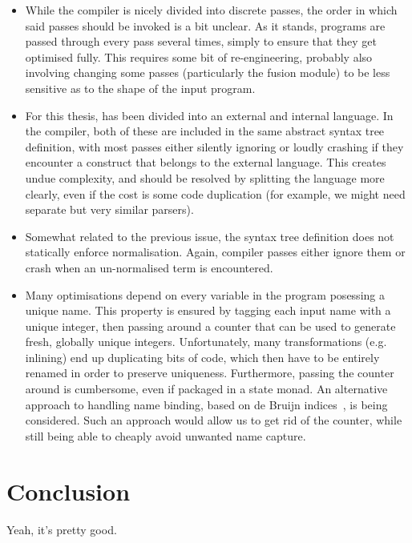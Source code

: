 \begin{itemize}
\item While the compiler is nicely divided into discrete passes, the
  order in which said passes should be invoked is a bit unclear.  As
  it stands, programs are passed through every pass several times,
  simply to ensure that they get optimised fully.  This requires some
  bit of re-engineering, probably also involving changing some passes
  (particularly the fusion module) to be less sensitive as to the
  shape of the input program.

\item For this thesis, \LO{} has been divided into an external and
  internal language.  In the compiler, both of these are included in
  the same abstract syntax tree definition, with most passes either
  silently ignoring or loudly crashing if they encounter a construct
  that belongs to the external language.  This creates undue
  complexity, and should be resolved by splitting the language more
  clearly, even if the cost is some code duplication (for example, we
  might need separate but very similar parsers).

\item Somewhat related to the previous issue, the \LO{} syntax tree
  definition does not statically enforce normalisation.  Again,
  compiler passes either ignore them or crash when an un-normalised
  term is encountered.

\item Many optimisations depend on every variable in the program
  posessing a unique name.  This property is ensured by tagging each
  input name with a unique integer, then passing around a counter that
  can be used to generate fresh, globally unique integers.
  Unfortunately, many transformations (e.g. inlining) end up
  duplicating bits of code, which then have to be entirely renamed in
  order to preserve uniqueness.  Furthermore, passing the counter
  around is cumbersome, even if packaged in a state monad.  An
  alternative approach to handling name binding, based on de Bruijn
  indices~\cite{McBride:2004:FPI:1017472.1017477}, is being
  considered.  Such an approach would allow us to get rid of the
  counter, while still being able to cheaply avoid unwanted name
  capture.
\end{itemize}

\section{Conclusion}
\label{sec:conclusion}

Yeah, it's pretty good.

